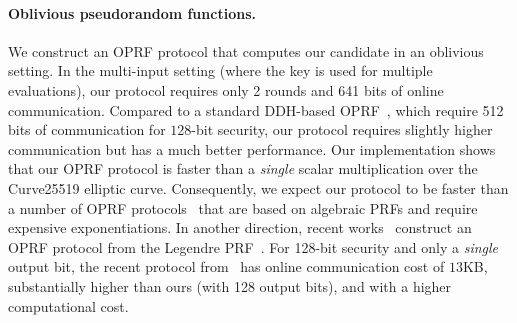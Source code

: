 \paragraph{Oblivious pseudorandom functions.} 
We construct an OPRF protocol that computes our \ttwPRF candidate in an oblivious setting. In the multi-input setting (where the key is used for multiple evaluations), our protocol requires only 2 rounds and 641 bits of online communication.
Compared to a standard DDH-based OPRF~\cite{jarecki2014-ddhoprf,jarecki2016-ddhoprf}, which require 512 bits of communication for $128$-bit security, our protocol requires slightly higher communication but has a much better performance. Our implementation shows that our OPRF protocol is faster than a \textit{single} scalar multiplication over the Curve25519 elliptic curve. Consequently, we expect our protocol to be faster than a number of OPRF protocols~\cite{freedman2005-oprf,jarecki2009-oprf} that are based on algebraic PRFs and require expensive exponentiations. In another direction, recent works~\cite{grassi2016-mpcfriendly,seres2021-legendre} construct an OPRF protocol from the Legendre PRF~\cite{damgard1988-legendre}. For 128-bit security and only a {\em single} output bit, the recent protocol from~\cite{seres2021-legendre} has online communication cost of $13$KB, substantially higher than ours (with 128 output bits), and with a higher computational cost.





